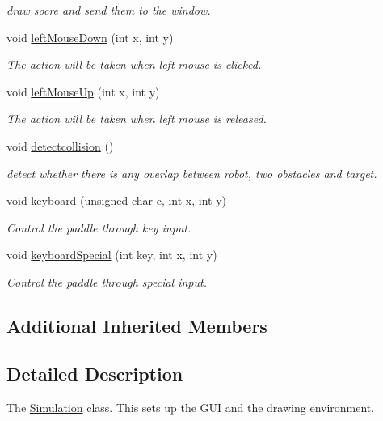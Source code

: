 \begin{DoxyCompactItemize}
\begin{DoxyCompactList}\small\item\em draw socre and send them to the window. \end{DoxyCompactList}\item 
void \hyperlink{classSimulation_a786d1ba31d29937f0ac6f3ea88f8a607}{left\+Mouse\+Down} (int x, int y)
\begin{DoxyCompactList}\small\item\em The action will be taken when left mouse is clicked. \end{DoxyCompactList}\item 
void \hyperlink{classSimulation_a62ef254d85017074cd521a5787b5a234}{left\+Mouse\+Up} (int x, int y)
\begin{DoxyCompactList}\small\item\em The action will be taken when left mouse is released. \end{DoxyCompactList}\item 
\hypertarget{classSimulation_a6a27947a5930814ce49a64031cb7bd20}{void \hyperlink{classSimulation_a6a27947a5930814ce49a64031cb7bd20}{detectcollision} ()}\label{classSimulation_a6a27947a5930814ce49a64031cb7bd20}

\begin{DoxyCompactList}\small\item\em detect whether there is any overlap between robot, two obstacles and target. \end{DoxyCompactList}\item 
void \hyperlink{classSimulation_ae6357accd475e97092874c33653b6d3d}{keyboard} (unsigned char c, int x, int y)
\begin{DoxyCompactList}\small\item\em Control the paddle through key input. \end{DoxyCompactList}\item 
void \hyperlink{classSimulation_ac60b25961b18057239efcb610b5c679f}{keyboard\+Special} (int key, int x, int y)
\begin{DoxyCompactList}\small\item\em Control the paddle through special input. \end{DoxyCompactList}\end{DoxyCompactItemize}
\subsection*{Additional Inherited Members}


\subsection{Detailed Description}
The \hyperlink{classSimulation}{Simulation} class. This sets up the G\+U\+I and the drawing environment. 

